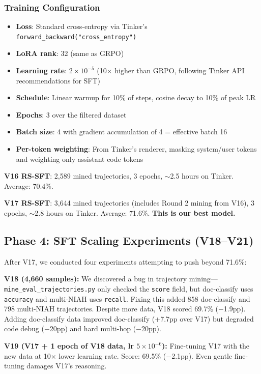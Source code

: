 \documentclass{article}
\begin{document}
\subsubsection{Training Configuration}

\begin{itemize}
    \item \textbf{Loss}: Standard cross-entropy via Tinker's \texttt{forward\_backward("cross\_entropy")}
    \item \textbf{LoRA rank}: 32 (same as GRPO)
    \item \textbf{Learning rate}: $2{\times}10^{-5}$ (10$\times$ higher than GRPO, following Tinker API recommendations for SFT)
    \item \textbf{Schedule}: Linear warmup for 10\% of steps, cosine decay to 10\% of peak LR
    \item \textbf{Epochs}: 3 over the filtered dataset
    \item \textbf{Batch size}: 4 with gradient accumulation of 4 = effective batch 16
    \item \textbf{Per-token weighting}: From Tinker's renderer, masking system/user tokens and weighting only assistant code tokens
\end{itemize}

\textbf{V16 RS-SFT}: 2,589 mined trajectories, 3 epochs, $\sim$2.5 hours on Tinker. Average: 70.4\%.

\textbf{V17 RS-SFT}: 3,644 mined trajectories (includes Round 2 mining from V16), 3 epochs, $\sim$2.8 hours on Tinker. Average: 71.6\%. \textbf{This is our best model.}

\subsection{Phase 4: SFT Scaling Experiments (V18--V21)}
\label{sec:scaling}

After V17, we conducted four experiments attempting to push beyond 71.6\%:

\textbf{V18 (4,660 samples):} We discovered a bug in trajectory mining---\texttt{mine\_eval\_trajectories.py} only checked the \texttt{score} field, but doc-classify uses \texttt{accuracy} and multi-NIAH uses \texttt{recall}. Fixing this added 858 doc-classify and 798 multi-NIAH trajectories. Despite more data, V18 scored 69.7\% ($-$1.9pp). Adding doc-classify data improved doc-classify (+7.7pp over V17) but degraded code debug ($-$20pp) and hard multi-hop ($-$20pp).

\textbf{V19 (V17 + 1 epoch of V18 data, lr $5{\times}10^{-6}$):} Fine-tuning V17 with the new data at 10$\times$ lower learning rate. Score: 69.5\% ($-$2.1pp). Even gentle fine-tuning damages V17's reasoning.
\end{document}
